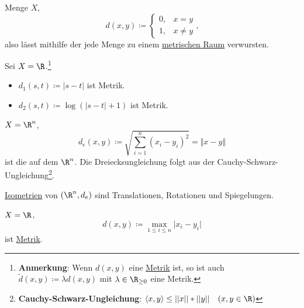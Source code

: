 \begin{example}
  \label{bsp:trivialeMetrik}
  Menge $ X $,
  \begin{equation*}
    d(x, y) \coloneqq \begin{cases}
    0, &x = y \\
    1, & x \neq y
  \end{cases}\text{,}
  \end{equation*}
  also lässt mithilfe der  jede Menge zu einem \hyperref[def:metrischerRaum]{metrischen Raum} verwursten. 
\end{example}

\begin{example}
  \label{bsp:simpleMetriken}
  Sei $ X = \R $.\footnote{\textbf{Anmerkung}: Wenn $ d(x, y) $ eine \hyperref[def:metrik]{Metrik} ist, so ist auch $ \widetilde{d}(x, y) \coloneqq \lambda d(x, y) $ mit $ \lambda \in \R_{\geq 0} $ eine Metrik.}
  \begin{itemize}
    \item $ d_1(s, t) \coloneqq |s-t| $ ist Metrik.
    \item $ d_2(s, t) \coloneqq \log(|s-t|+1) $ ist Metrik.
  \end{itemize}
\end{example}

\begin{example}
  \label{bsp:standardmetrik}
  $ X = \R^n $,
  \begin{equation*}
    d_e(x, y) \coloneqq \sqrt{\sum_{i=1}^n(x_i-y_i)^2} = \Vert x-y \Vert
  \end{equation*}
  ist die  auf dem $ \R^n $. Die Dreiecksungleichung folgt aus der Cauchy-Schwarz-Ungleichung\footnote{\textbf{Cauchy-Schwarz-Ungleichung}: $ \langle x, y \rangle \leq ||x||*||y|| \quad (x, y \in \R) $}.
\end{example}

\begin{remark}[aus LA II]
  \hyperref[def:isometrie]{Isometrien} von $ (\R^n, d_e) $ sind Translationen, Rotationen und Spiegelungen.
\end{remark}

\begin{example}[Maximumsmetrik]
  \label{bsp:maximumsmetrik}
  $ X = \R $,
  \begin{equation*}
    d(x, y) \coloneqq \underset{1 \leq i \leq n}{\max} \vert x_i-y_i \vert
  \end{equation*}
  ist \hyperref[def:metrik]{Metrik}.
\end{example}

